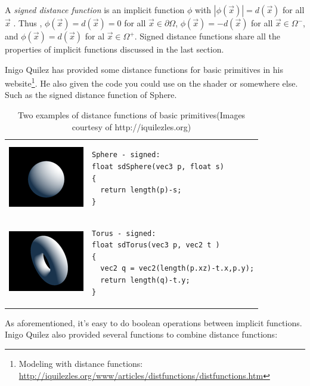 A \textit{signed distance function} is an implicit function $\phi$ with $|\phi(\vec{x})| = d(\vec{x})$ for all $\vec{x}$ . Thus , $\phi(\vec{x}) = d(\vec{x})=0$ for all $\vec{x}\in\partial\Omega$, $\phi(\vec{x})=-d(\vec{x})$ for all $\vec{x}\in\Omega^-$, and $\phi(\vec{x}) = d(\vec{x})$ for al $\vec{x}\in\Omega^+$. Signed distance functions share all the properties of implicit functions discussed in the last section.

Inigo Quilez has provided some distance functions for basic primitives in his website\footnote{Modeling with distance functions: \url{http://iquilezles.org/www/articles/distfunctions/distfunctions.htm}}. He also given the code you could use on the shader or somewhere else. Such as the signed distance function of Sphere.

\begin{table}
\begin{tabular}{m{3.0cm}m{}} 
\includegraphics{graphics/df/sphere} &
	 \begin{lstlisting}
Sphere - signed:
float sdSphere(vec3 p, float s)
{
  return length(p)-s;
}
\end{lstlisting} \\
   \includegraphics{graphics/df/torus} & 
    \begin{lstlisting}
Torus - signed:
float sdTorus(vec3 p, vec2 t )
{
  vec2 q = vec2(length(p.xz)-t.x,p.y);
  return length(q)-t.y;
}
   \end{lstlisting}
\end{tabular}
\caption{Two examples of distance functions of basic primitives(Images courtesy of http://iquilezles.org)}
\end{table}

As aforementioned, it's easy to do boolean operations between implicit functions. Inigo Quilez also provided several functions to combine distance functions:

